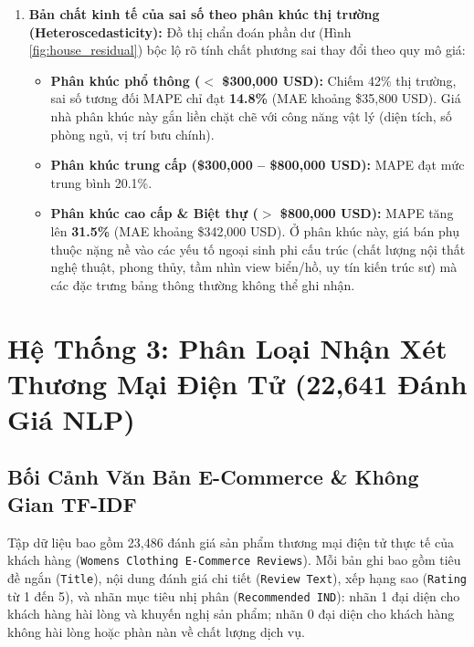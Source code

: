 \documentclass[12pt,a4paper]{report}
\begin{document}
\begin{enumerate}
    \item \textbf{Bản chất kinh tế của sai số theo phân khúc thị trường (Heteroscedasticity):}
    Đồ thị chẩn đoán phần dư (Hình \ref{fig:house_residual}) bộc lộ rõ tính chất phương sai thay đổi theo quy mô giá:
    \begin{itemize}
        \item \textbf{Phân khúc phổ thông ($<$ \$300,000 USD):} Chiếm 42\% thị trường, sai số tương đối MAPE chỉ đạt \textbf{14.8\%} (MAE khoảng \$35,800 USD). Giá nhà phân khúc này gắn liền chặt chẽ với công năng vật lý (diện tích, số phòng ngủ, vị trí bưu chính).
        \item \textbf{Phân khúc trung cấp (\$300,000 -- \$800,000 USD):} MAPE đạt mức trung bình 20.1\%.
        \item \textbf{Phân khúc cao cấp \& Biệt thự ($>$ \$800,000 USD):} MAPE tăng lên \textbf{31.5\%} (MAE khoảng \$342,000 USD). Ở phân khúc này, giá bán phụ thuộc nặng nề vào các yếu tố ngoại sinh phi cấu trúc (chất lượng nội thất nghệ thuật, phong thủy, tầm nhìn view biển/hồ, uy tín kiến trúc sư) mà các đặc trưng bảng thông thường không thể ghi nhận.
    \end{itemize}
\end{enumerate}

\chapter{Hệ Thống 3: Phân Loại Nhận Xét Thương Mại Điện Tử (22,641 Đánh Giá NLP)}

\section{Bối Cảnh Văn Bản E-Commerce \& Không Gian TF-IDF}
Tập dữ liệu bao gồm 23,486 đánh giá sản phẩm thương mại điện tử thực tế của khách hàng (\texttt{Womens Clothing E-Commerce Reviews}). Mỗi bản ghi bao gồm tiêu đề ngắn (\texttt{Title}), nội dung đánh giá chi tiết (\texttt{Review Text}), xếp hạng sao (\texttt{Rating} từ 1 đến 5), và nhãn mục tiêu nhị phân (\texttt{Recommended IND}): nhãn 1 đại diện cho khách hàng hài lòng và khuyến nghị sản phẩm; nhãn 0 đại diện cho khách hàng không hài lòng hoặc phàn nàn về chất lượng dịch vụ.
\end{document}
